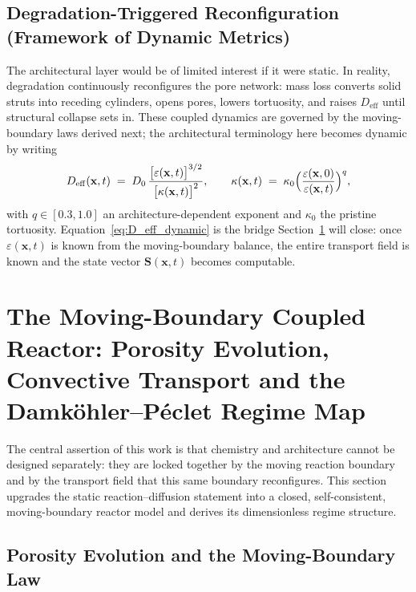 \documentclass[11pt]{article}
\newcommand{\Veff}{D_{\mathrm{eff}}}
\begin{document}
\subsection{Degradation-Triggered Reconfiguration (Framework of Dynamic Metrics)}
\label{sec:arch_dynamic}


The architectural layer would be of limited interest if it were static. In reality, degradation continuously reconfigures the pore network: mass loss converts solid struts into receding cylinders, opens pores, lowers tortuosity, and raises $\Veff$ until structural collapse sets in. These coupled dynamics are governed by the moving-boundary laws derived next; the architectural terminology here becomes dynamic by writing
\begin{equation}
\Veff(\mathbf{x},t) \;=\; D_0\,\frac{\bigl[\varepsilon(\mathbf{x},t)\bigr]^{3/2}}{\bigl[\kappa(\mathbf{x},t)\bigr]^{2}},\qquad
\kappa(\mathbf{x},t) \;=\; \kappa_0\Bigl(\frac{\varepsilon(\mathbf{x},0)}{\varepsilon(\mathbf{x},t)}\Bigr)^{q},
\label{eq:D_eff_dynamic}
\end{equation}
with $q\in[0.3,1.0]$ an architecture-dependent exponent and $\kappa_0$ the pristine tortuosity. Equation~\eqref{eq:D_eff_dynamic} is the bridge Section~\ref{sec:couple} will close: once $\varepsilon(\mathbf{x},t)$ is known from the moving-boundary balance, the entire transport field is known and the state vector $\mathbf{S}(\mathbf{x},t)$ becomes computable.


\section{The Moving-Boundary Coupled Reactor: Porosity Evolution, Convective Transport and the Damk\"ohler--P\'eclet Regime Map}
\label{sec:couple}


The central assertion of this work is that chemistry and architecture cannot be designed separately: they are locked together by the moving reaction boundary and by the transport field that this same boundary reconfigures. This section upgrades the static reaction--diffusion statement into a closed, self-consistent, moving-boundary reactor model and derives its dimensionless regime structure.


\subsection{Porosity Evolution and the Moving-Boundary Law}
\end{document}
